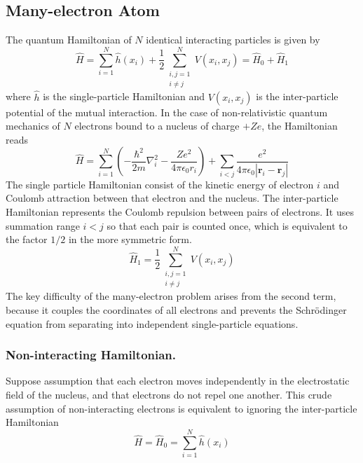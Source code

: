 \documentclass[../../../main.tex]{subfiles}
\begin{document}
\subsection{Many-electron Atom}
The quantum Hamiltonian of $N$ identical interacting particles is given by
\begin{equation*}
  \hat{H} = \sum_{i=1}^{N} \hat{h}(x_i) + \frac{1}{2} \sum_{\substack{i,j=1 \\ i \neq j}}^{N} V(x_i, x_j) = \hat{H}_0 + \hat{H}_1
\end{equation*}
where $\hat{h}$ is the single-particle Hamiltonian and $V(x_i, x_j)$ is the inter-particle potential of the mutual interaction.
In the case of non-relativistic quantum mechanics of $N$ electrons bound to a nucleus of charge $+Ze$, the Hamiltonian reads
\begin{equation*}
  \hat{H} = \sum_{i=1}^{N} \left( -\frac{\hbar^2}{2m} \nabla_i^2 - \frac{Ze^2}{4\pi \epsilon_0 r_i} \right) + \sum_{i<j} \frac{e^2}{4\pi\epsilon_0 |\mathbf{r}_i - \mathbf{r}_j|}
\end{equation*}
The single particle Hamiltonian consist of the kinetic energy of electron $i$ and Coulomb attraction between that electron and the nucleus.
The inter-particle Hamiltonian represents the Coulomb repulsion between pairs of electrons.
It uses summation range $i<j$ so that each pair is counted once, which is equivalent to the factor $1/2$ in the more symmetric form.
\begin{equation*}
  \hat{H}_1=\frac{1}{2} \sum_{\substack{i,j=1 \\ i \neq j}}^{N} V(x_i, x_j)
\end{equation*}
The key difficulty of the many-electron problem arises from the second term, because it couples the coordinates of all electrons and prevents the Schrödinger equation from separating into independent single-particle equations.

\subsubsection{Non-interacting Hamiltonian.}
Suppose assumption that each electron moves independently in the electrostatic field of the nucleus, and that electrons do not repel one another.
This crude assumption of non-interacting electrons is equivalent to ignoring the inter-particle Hamiltonian
\begin{equation*}
  \hat{H} = \hat{H}_0 = \sum_{i=1}^{N} \hat{h}(x_i)
\end{equation*}
\end{document}
